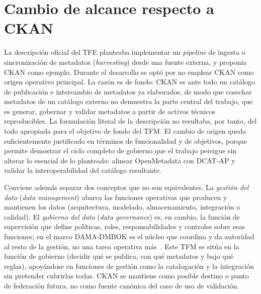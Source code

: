 \section{Cambio de alcance respecto a CKAN}

La descripción oficial del TFE planteaba implementar un \emph{pipeline} de ingesta o sincronización de metadatos (\emph{harvesting}) desde una fuente externa, y proponía CKAN como ejemplo. Durante el desarrollo se optó por no emplear CKAN como origen operativo principal. La razón es de fondo: CKAN es ante todo un catálogo de publicación e intercambio de metadatos ya elaborados, de modo que cosechar metadatos de un catálogo externo no demuestra la parte central del trabajo, que es generar, gobernar y validar metadatos a partir de activos técnicos reproducibles. La formulación literal de la descripción no resultaba, por tanto, del todo apropiada para el objetivo de fondo del TFM. El cambio de origen queda suficientemente justificado en términos de funcionalidad y de objetivos, porque permite demostrar el ciclo completo de gobierno que el trabajo persigue sin alterar lo esencial de lo planteado: alinear OpenMetadata con DCAT-AP y validar la interoperabilidad del catálogo resultante.

Conviene además separar dos conceptos que no son equivalentes. La \emph{gestión del dato} (\emph{data management}) abarca las funciones operativas que producen y mantienen los datos (arquitectura, modelado, almacenamiento, integración o calidad). El \emph{gobierno del dato} (\emph{data governance}) es, en cambio, la función de supervisión que define políticas, roles, responsabilidades y controles sobre esas funciones; en el marco DAMA-DMBOK es el núcleo que coordina y da autoridad al resto de la gestión, no una tarea operativa más~\cite{damaDmbok,datosGobDama2021}. Este TFM se sitúa en la función de gobierno (decidir qué se publica, con qué metadatos y bajo qué reglas), apoyándose en funciones de gestión como la catalogación y la integración sin pretender cubrirlas todas. CKAN se mantiene como posible destino o punto de federación futura, no como fuente canónica del caso de uso de validación.
